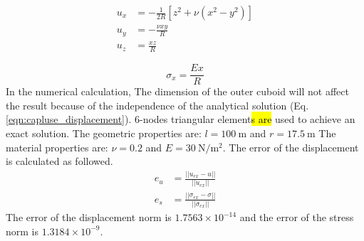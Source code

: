 \begin{subequations}
\begin{align}
  u_x &= -\frac{1}{2R}\left[z^2 + \nu \left(x^2 - y^2 \right)\right]\\
  u_y &= -\frac{\nu xy}{R}\\
  u_z &= \frac{xz}{R} 
  \label{eqn:capluse_displacement}
\end{align}
\end{subequations}

\begin{equation}
  \sigma_x = \frac{Ex}{R}
  \label{eqn:caplus_stress}
\end{equation}
%
In the numerical calculation, The dimension of the outer cuboid will not affect the result because of the independence of the analytical solution (Eq.\ref{eqn:capluse_displacement}).
6-nodes triangular element\hl{s are} used to achieve an exact solution.
The geometric properties are: $l=\SI{100}{\meter}$ and $r=\SI{17.5}{\meter}$
The material properties are: $\nu=0.2$ and $E=\SI{30}{\newton \per \square \meter}$.
The error of the displacement is calculated as followed.
\begin{subequations}
\begin{align}
e_u &= \frac{||u_{ex} - u||}{||u_{ex}||}\\
e_s &= \frac{||\sigma_{ex} - \sigma||}{||\sigma_{ex}||}
\end{align}
\end{subequations}
%
The error of the displacement norm is $1.7563\times 10^{-14}$ and the error of the stress norm is $1.3184\times 10^{-9}$.
